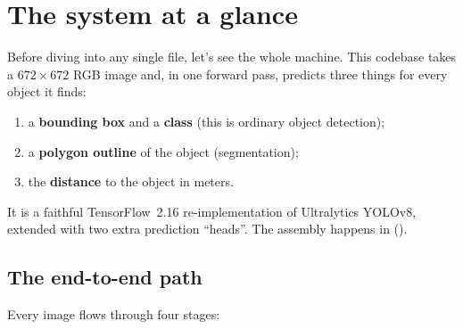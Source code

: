 \chapter{The system at a glance}

Before diving into any single file, let's see the whole machine. This codebase takes a
$672\times672$ RGB image and, in one forward pass, predicts three things for every
object it finds:

\begin{enumerate}[leftmargin=1.4em,itemsep=1pt]
  \item a \textbf{bounding box} and a \textbf{class} (this is ordinary object detection);
  \item a \textbf{polygon outline} of the object (segmentation);
  \item the \textbf{distance} to the object in meters.
\end{enumerate}

It is a faithful TensorFlow~2.16 re-implementation of Ultralytics YOLOv8, extended with
two extra prediction ``heads''. The assembly happens in 
().

\section{The end-to-end path}
Every image flows through four stages:

\begin{center}
\end{center}

